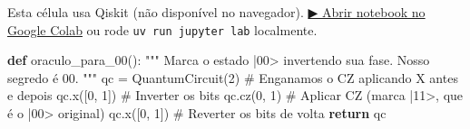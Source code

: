 \documentclass[
  brazilian,
]{report}
\newenvironment{Shaded}{\begin{snugshade}}{\end{snugshade}}
\newcommand{\CommentTok}[1]{\textcolor[rgb]{0.37,0.37,0.37}{#1}}
\newcommand{\ControlFlowTok}[1]{\textcolor[rgb]{0.00,0.23,0.31}{\textbf{#1}}}
\newcommand{\DecValTok}[1]{\textcolor[rgb]{0.68,0.00,0.00}{#1}}
\newcommand{\KeywordTok}[1]{\textcolor[rgb]{0.00,0.23,0.31}{\textbf{#1}}}
\newcommand{\NormalTok}[1]{\textcolor[rgb]{0.00,0.23,0.31}{#1}}
\newcommand{\OperatorTok}[1]{\textcolor[rgb]{0.37,0.37,0.37}{#1}}
\begin{document}
\begin{tcolorbox}[enhanced jigsaw, arc=.35mm, bottomrule=.15mm, bottomtitle=1mm, breakable, colback=white, colbacktitle=quarto-callout-warning-color!10!white, colframe=quarto-callout-warning-color-frame, coltitle=black, left=2mm, leftrule=.75mm, opacityback=0, opacitybacktitle=0.6, rightrule=.15mm, title=\textcolor{quarto-callout-warning-color}{\faExclamationTriangle}\hspace{0.5em}{⚛️ Célula Qiskit --- execute no Colab ou localmente}, titlerule=0mm, toprule=.15mm, toptitle=1mm]

Esta célula usa Qiskit (não disponível no navegador).
\href{https://colab.research.google.com/github/maxwellamaral/aula-quantum/blob/main/notebooks/06-grover.ipynb}{▶
Abrir notebook no Google Colab} ou rode \texttt{uv\ run\ jupyter\ lab}
localmente.

\begin{Shaded}
\begin{Highlighting}[]

\KeywordTok{def}\NormalTok{ oraculo\_para\_00():}
    \CommentTok{"""}
\CommentTok{    Marca o estado |00\textgreater{} invertendo sua fase.}
\CommentTok{    Nosso \textquotesingle{}segredo\textquotesingle{} é 00.}
\CommentTok{    """}
\NormalTok{    qc }\OperatorTok{=}\NormalTok{ QuantumCircuit(}\DecValTok{2}\NormalTok{)}
    \CommentTok{\# Enganamos o CZ aplicando X antes e depois}
\NormalTok{    qc.x([}\DecValTok{0}\NormalTok{, }\DecValTok{1}\NormalTok{])  }\CommentTok{\# Inverter os bits}
\NormalTok{    qc.cz(}\DecValTok{0}\NormalTok{, }\DecValTok{1}\NormalTok{)   }\CommentTok{\# Aplicar CZ (marca |11\textgreater{}, que é o |00\textgreater{} original)}
\NormalTok{    qc.x([}\DecValTok{0}\NormalTok{, }\DecValTok{1}\NormalTok{])  }\CommentTok{\# Reverter os bits de volta}
    \ControlFlowTok{return}\NormalTok{ qc}
\end{Highlighting}
\end{Shaded}

\end{tcolorbox}
\end{document}
